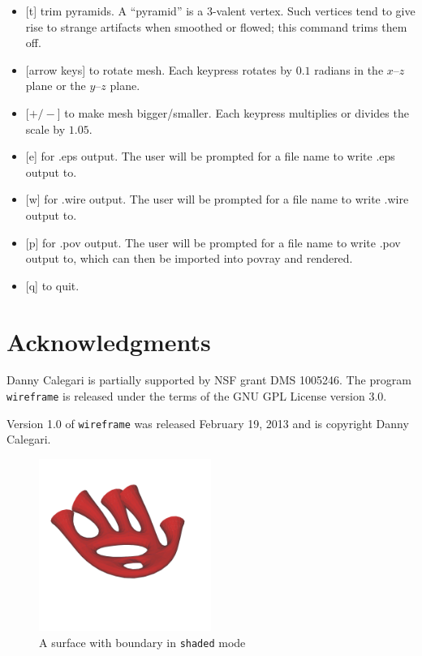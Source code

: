 \documentclass[12pt]{article}
\begin{document}
\begin{itemize}
{does not retriangulate the surface. Can be used effectively in conjunction with the retriangulation operation.}
\item{[t] trim pyramids. A ``pyramid'' is a 3-valent vertex. Such vertices tend to give rise to
strange artifacts when smoothed or flowed; this command trims them off.}
\item{[arrow keys] to rotate mesh. Each keypress rotates by $0.1$ radians in the $x$--$z$ plane or
the $y$--$z$ plane.}
\item{[$+/-$] to make mesh bigger/smaller. Each keypress multiplies or divides the scale by $1.05$.}
\item{[e] for .eps output. The user will be prompted for a file name to write .eps output to.}
\item{[w] for .wire output. The user will be prompted for a file name to write .wire output to.}
\item{[p] for .pov output. The user will be prompted for a file name to write .pov output to, which
can then be imported into povray and rendered.}
\item{[q] to quit.}
\end{itemize}

\section{Acknowledgments}
Danny Calegari is partially supported by NSF grant DMS 1005246. The program {\tt wireframe} is
released under the terms of the GNU GPL License version 3.0.

\medskip

\noindent Version 1.0 of {\tt wireframe} was released February 19, 2013 and is copyright Danny Calegari.

\begin{figure}[ht]
  \caption{A surface with boundary in {\tt shaded} mode}\label{red_hand}
  \centering
  	\includegraphics[width=0.5\textwidth]{red_hand}
\end{figure}
\end{document}
